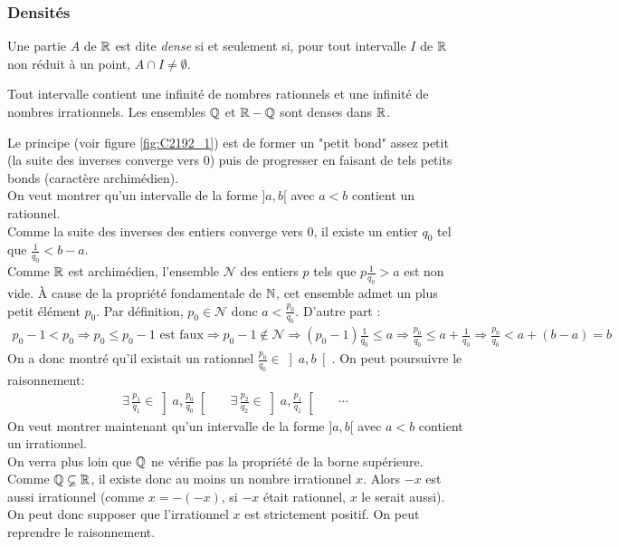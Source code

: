 \subsubsection{Densités}
\begin{defi}
 Une partie $A$ de $\mathbb{R}$ est dite \emph{dense} si et seulement si, pour tout intervalle $I$ de $\mathbb{R}$ non réduit à un point, $A\cap I\neq \emptyset$.
\end{defi}
\begin{prop}
Tout intervalle contient une infinité de nombres rationnels et une infinité de nombres irrationnels. Les ensembles $\mathbb{Q}$ et $\mathbb{R}-\mathbb{Q}$ sont denses dans $\mathbb{R}$. 
\end{prop}
\begin{demo}
 Le principe (voir figure \ref{fig:C2192_1}) est de former un "petit bond" assez petit (la suite des inverses converge vers $0$) puis de progresser en faisant de tels petits bonds (caractère archimédien).\\
On veut montrer qu'un intervalle de la forme $]a,b[$ avec $a<b$ contient un rationnel.\\
Comme la suite des inverses des entiers converge vers $0$, il existe un entier $q_0$ tel que $\frac{1}{q_0}<b-a$. \\
Comme $\mathbb{R}$ est archimédien, l'ensemble $\mathcal N$ des entiers $p$ tels que $p\frac{1}{q_0}>a$ est non vide. \`A cause de la propriété fondamentale de $\mathbb{N}$, cet ensemble admet un plus petit élément $p_0$. Par définition, $p_0 \in \mathcal N$ donc $a < \frac{p_0}{q_0}$. D'autre part :
\begin{multline*}
p_0-1<p_0\Rightarrow p_0\leq p_0-1 \text{ est faux}
\Rightarrow p_0-1 \notin \mathcal N
\Rightarrow (p_0-1)\frac{1}{q_0}\leq a
\Rightarrow \frac{p_0}{q_0}\leq a + \frac{1}{q_0}
\Rightarrow \frac{p_0}{q_0} < a + (b-a)=b
\end{multline*}
On a donc montré qu'il existait un rationnel $\frac{p_0}{q_0}\in \left]a,b\right[$. On peut poursuivre le raisonnement:
\begin{align*}
 \exists \,\frac{p_1}{q_1} \in \left]a,\frac{p_0}{q_0} \right[ & &
 \exists \,\frac{p_2}{q_2} \in \left]a,\frac{p_1}{q_1} \right[ & & \cdots
\end{align*}
On veut montrer maintenant qu'un intervalle de la forme $]a,b[$ avec $a<b$ contient un irrationnel.\\
On verra plus loin que $\mathbb{Q}$ ne vérifie pas la propriété de la borne supérieure. Comme $\mathbb{Q}\varsubsetneq \mathbb{R}$, il existe donc au moins un nombre irrationnel $x$. Alors $-x$ est aussi irrationnel (comme $x=-(-x)$, si $-x$ était rationnel, $x$ le serait aussi). On peut donc supposer que l'irrationnel $x$ est strictement positif. On peut reprendre le raisonnement.\\

\end{demo}
